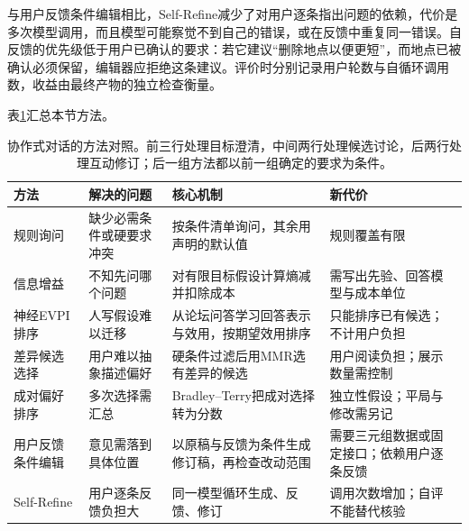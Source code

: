 与用户反馈条件编辑相比，Self-Refine减少了对用户逐条指出问题的依赖，代价是多次模型调用，而且模型可能察觉不到自己的错误，或在反馈中重复同一错误。自反馈的优先级低于用户已确认的要求：若它建议“删除地点以便更短”，而地点已被确认必须保留，编辑器应拒绝这条建议。评价时分别记录用户轮数与自循环调用数，收益由最终产物的独立检查衡量。

表\ref{tab:nlp-dialogue-collaboration-methods}汇总本节方法。

\begin{table}[htbp]
  \centering
  \small
  \setlength{\tabcolsep}{3pt}
  \renewcommand{\tabularxcolumn}[1]{>{\raggedright\arraybackslash}p{#1}}
  \begin{tabularx}{\linewidth}{@{}>{\raggedright\arraybackslash}p{28mm}XXX@{}}
    \toprule
    方法 & 解决的问题 & 核心机制 & 新代价\\
    \midrule
    规则询问 & 缺少必需条件或硬要求冲突 & 按条件清单询问，其余用声明的默认值 & 规则覆盖有限\\
    \addlinespace
    信息增益 & 不知先问哪个问题 & 对有限目标假设计算熵减并扣除成本 & 需写出先验、回答模型与成本单位\\
    \addlinespace
    神经EVPI排序 & 人写假设难以迁移 & 从论坛问答学习回答表示与效用，按期望效用排序 & 只能排序已有候选；不计用户负担\\
    \addlinespace
    差异候选选择 & 用户难以抽象描述偏好 & 硬条件过滤后用MMR选有差异的候选 & 用户阅读负担；展示数量需控制\\
    \addlinespace
    成对偏好排序 & 多次选择需汇总 & Bradley--Terry把成对选择转为分数 & 独立性假设；平局与修改需另记\\
    \addlinespace
    用户反馈条件编辑 & 意见需落到具体位置 & 以原稿与反馈为条件生成修订稿，再检查改动范围 & 需要三元组数据或固定接口；依赖用户逐条反馈\\
    \addlinespace
    Self-Refine & 用户逐条反馈负担大 & 同一模型循环生成、反馈、修订 & 调用次数增加；自评不能替代核验\\
    \bottomrule
  \end{tabularx}
  \caption{协作式对话的方法对照。前三行处理目标澄清，中间两行处理候选讨论，后两行处理互动修订；后一组方法都以前一组确定的要求为条件。}
  \label{tab:nlp-dialogue-collaboration-methods}
\end{table}

